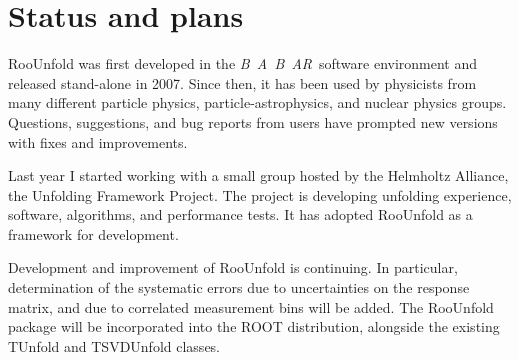 \documentclass{cernrep}
\newcommand{\babar}{\mbox{\sl B\hspace{-0.4em} {\small\sl A}\hspace{-0.37em} \sl B\hspace{-0.4em} {\small\sl A\hspace{-0.02em}R}}}
\begin{document}
\section{Status and plans}

RooUnfold was first developed in the \babar\ software environment and
released stand-alone in 2007.
Since then, it has been used by physicists from many
different particle physics, particle-astrophysics, and nuclear physics groups.
Questions, suggestions, and bug reports from users
have prompted new versions with fixes and improvements.

Last year I started working with a small group hosted by the
Helmholtz Alliance, the Unfolding Framework Project\cite{unfolding-project}.
The project is developing unfolding experience, software, algorithms, and performance tests.
It has adopted RooUnfold as a framework for development.

Development and improvement of RooUnfold is continuing.
In particular, determination of the systematic errors due to uncertainties on
the response matrix, and due to correlated measurement bins will be added.
The RooUnfold package will be incorporated into the ROOT distribution,
alongside the existing TUnfold and TSVDUnfold classes.

\end{document}
